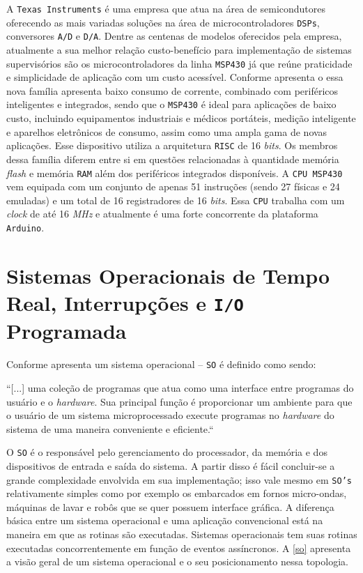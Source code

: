 A \texttt{Texas Instruments} é uma empresa que atua na área de semicondutores oferecendo as mais variadas soluções na área de 
microcontroladores \texttt{DSPs}, conversores \texttt{A/D} e \texttt{D/A}. Dentre as centenas de modelos oferecidos pela empresa, 
atualmente a sua melhor relação custo-benefício para implementação de sistemas supervisórios são os microcontroladores da linha 
\texttt{MSP430} já que reúne praticidade e simplicidade de aplicação com um custo acessível. Conforme apresenta o \cite{sabereletronica} 
essa nova família apresenta baixo consumo de corrente, combinado com periféricos inteligentes e integrados, sendo que o \texttt{MSP430} é 
ideal para aplicações de baixo custo, incluindo equipamentos industriais e médicos portáteis, medição inteligente e aparelhos eletrônicos 
de consumo, assim como uma ampla gama de novas aplicações. Esse dispositivo utiliza a arquitetura \texttt{RISC} de 16 \textit{bits}. Os membros 
dessa família diferem entre si em questões relacionadas à quantidade memória \textit{flash} e memória \texttt{RAM} além dos periféricos 
integrados disponíveis. A \texttt{CPU MSP430} vem equipada com um conjunto de apenas 51 instruções (sendo 27 físicas e 24 emuladas) e um total 
de 16 registradores de 16 \textit{bits}. Essa \texttt{CPU} trabalha com um \textit{clock} de até 16 \textit{MHz} e atualmente é uma forte 
concorrente da plataforma \texttt{Arduino}.

\section{Sistemas Operacionais de Tempo Real, Interrupções e \texttt{I/O} Programada} 
Conforme apresenta \cite[p.~473]{limaevilaca} um sistema operacional – \texttt{SO} é definido como sendo: 

\begin{citacao}
``[...] uma coleção de programas que atua como uma interface entre programas do usuário e o \textit{hardware}. Sua principal função é proporcionar um ambiente para que o usuário de um sistema microprocessado execute programas no \textit{hardware} do sistema de uma maneira conveniente e eficiente.``
\end{citacao}

O \texttt{SO} é o responsável pelo gerenciamento do processador, da memória e dos dispositivos de entrada e saída do sistema. A partir disso é fácil concluir-se a grande complexidade envolvida em sua implementação; isso vale mesmo em \texttt{SO’s} relativamente simples como por exemplo os embarcados em fornos micro-ondas, máquinas de lavar e robôs que se quer possuem interface gráfica.  A diferença básica entre um sistema operacional e uma aplicação convencional está na maneira em que as rotinas são executadas. Sistemas operacionais tem suas rotinas executadas concorrentemente em função de eventos assíncronos. A \autoref{so} apresenta a visão geral de um sistema operacional e o seu posicionamento nessa topologia. 

